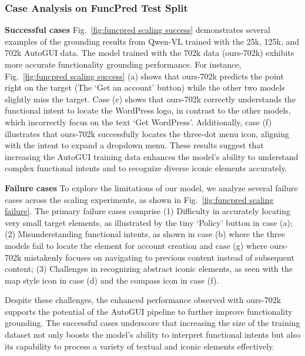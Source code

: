 \subsubsection{Case Analysis on FuncPred Test Split}
\label{sec:supp:case analysis}
\noindent\textbf{Successful cases} Fig.~\ref{fig:funcpred scaling success} demonstrates several examples of the grounding results from Qwen-VL trained with the 25k, 125k, and 702k AutoGUI data. The model trained with the 702k data (ours-702k) exhibits more accurate functionality grounding performance. For instance, Fig.~\ref{fig:funcpred scaling success} (a) shows that ours-702k predicts the point right on the target (The `Get an account' button) while the other two models slightly miss the target. Case (c) shows that ours-702k correctly understands the functional intent to locate the WordPress logo, in contrast to the other models, which incorrectly focus on the text `Get WordPress'. Additionally, case (f) illustrates that ours-702k successfully locates the three-dot menu icon, aligning with the intent to expand a dropdown menu. These results suggest that increasing the AutoGUI training data enhances the model's ability to understand complex functional intents and to recognize diverse iconic elements accurately.

\noindent\textbf{Failure cases} To explore the limitations of our model, we analyze several failure cases across the scaling experiments, as shown in Fig.~\ref{fig:funcpred scaling failure}. The primary failure cases comprise (1) Difficulty in accurately locating very small target elements, as illustrated by the tiny ‘Policy’ button in case (a); (2) Misunderstanding functional intents, as shown in case (b) where the three models fail to locate the element for account creation and case (g) where ours-702k mistakenly focuses on navigating to previous content instead of subsequent content; (3) Challenges in recognizing abstract iconic elements, as seen with the map style icon in case (d) and the compass icon in case (f).

Despite these challenges, the enhanced performance observed with ours-702k supports the potential of the AutoGUI pipeline to further improve functionality grounding. The successful cases underscore that increasing the size of the training dataset not only boosts the model’s ability to interpret functional intents but also its capability to process a variety of textual and iconic elements effectively.





